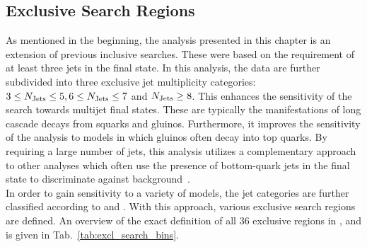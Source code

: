 \subsection{Exclusive Search Regions}
\label{subsec:RA2_search_regions}
As mentioned in the beginning, the analysis presented in this chapter is an extension of previous inclusive searches. These were based on the requirement of at least three jets in the final state. In this analysis, the data are further subdivided into three exclusive jet multiplicity categories: $3 \leq N_{\text{Jets}} \leq 5, 6 \leq N_{\text{Jets}} \leq 7$ and $N_{\text{Jets}} \ge 8$. This enhances the sensitivity of the search towards multijet final states. These are typically the manifestations of long cascade decays from squarks and gluinos. Furthermore, it improves the sensitivity of the analysis to models in which gluinos often decay into top quarks. By requiring a large number of jets, this analysis utilizes a complementary approach to other analyses which often use the presence of bottom-quark jets in the final state to discriminate against background~\cite{Chatrchyan:2013lya, Chatrchyan:2013wxa, CMS-PAS-SUS-13-019, CMS-PAS-SUS-14-011}. \\
In order to gain sensitivity to a variety of models, the jet categories are further classified according to \HT and \MHT. With this approach, various exclusive search regions are defined. An overview of the exact definition of all 36 exclusive regions in \NJets, \HT and \MHT is given in Tab.~\ref{tab:excl_search_bins}.
